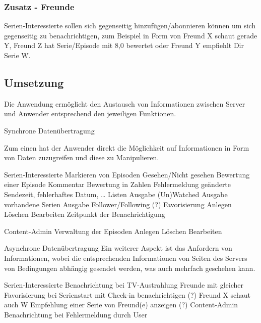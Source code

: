 \documentclass[a4paper]{article}
\begin{document}
\subsubsection{Zusatz - Freunde}
Serien-Interessierte sollen sich gegenseitig hinzufügen/abonnieren können um sich gegenseitig zu benachrichtigen, zum Beispiel in Form von Freund X schaut gerade Y, Freund Z hat Serie/Episode mit 8,0 bewertet oder Freund Y empfiehlt Dir Serie W.
  

\subsection{Umsetzung}
Die Anwendung ermöglicht den Austausch von Informationen zwischen Server und Anwender entsprechend den jeweiligen Funktionen. 

Synchrone Datenübertragung

Zum einen hat der Anwender direkt die Möglichkeit auf Informationen in Form von Daten zuzugreifen und diese zu Manipulieren.

Serien-Interessierte
    Markieren von Episoden
      Gesehen/Nicht gesehen
      Bewertung einer Episode
          Kommentar
          Bewertung in Zahlen 
      Fehlermeldung
          geänderte Sendezeit, fehlerhaftes Datum, …   
   Listen
      Ausgabe (Un)Watched
      Ausgabe vorhandene Serien
      Ausgabe Follower/Following (?)
    Favorisierung
      Anlegen
      Löschen
      Bearbeiten
          Zeitpunkt der Benachrichtigung
          
         
 Content-Admin
    Verwaltung der Episoden
       Anlegen
       Löschen
       Bearbeiten

Asynchrone Datenübertragung
Ein weiterer Aspekt ist das Anfordern von Informationen, wobei die entsprechenden Informationen von Seiten des Servers von Bedingungen abhängig gesendet werden, was auch mehrfach geschehen kann.

Serien-Interessierte
    Benachrichtung bei TV-Austrahlung
    Freunde mit gleicher Favorisierung bei Serienstart mit Check-in benachrichtigen (?)
         Freund X schaut auch W
    Empfehlung einer Serie von Freund(e) anzeigen (?)
Content-Admin
    Benachrichtung bei Fehlermeldung durch User
   
\end{document}
